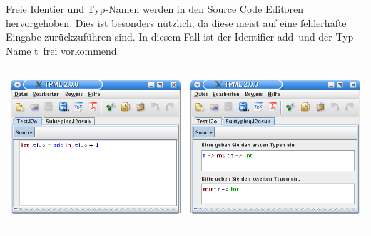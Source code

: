 {
  Freie Identier und Typ-Namen werden in den Source Code Editoren hervorgehoben.
  Dies ist besonders nützlich, da diese meist auf eine fehlerhafte Eingabe
  zurückzuführen sind. In diesem Fall ist der Identifier \glqq add\grqq\ und
  der Typ-Name \glqq t\grqq\ frei vorkommend.\\
  \begin{tabular}{p{12.1cm}@{}p{12.1cm}@{}}
    \begin{center}
      \includegraphics[width=11.6cm]{images/sourcecode_free_identifier.png} 
    \end{center}
    & 
    \begin{center}
      \includegraphics[width=11.6cm]{images/sourcecode_free_typename.png}
    \end{center}
  \end{tabular}
}
